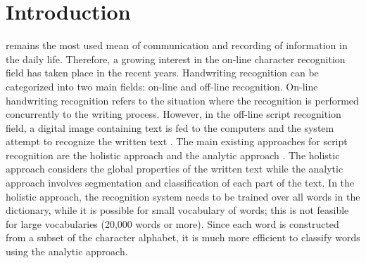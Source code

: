 \documentclass[journal,compsoc]{IEEEtran}
\begin{document}
\IEEEdisplaynotcompsoctitleabstractindextext

\section{Introduction}
\date
{} remains the most used mean of communication and recording of information in the daily life. Therefore, a growing interest in the on-line character recognition field has taken place in the recent years.
Handwriting recognition can be categorized into two main fields: on-line and off-line recognition. On-line handwriting recognition refers to the situation where the recognition is performed concurrently to the writing process. However, in the off-line script recognition field, a digital image containing text is fed to the computers and the system attempt to recognize the written text \cite{al2011online}. The main existing approaches for script recognition are the holistic approach \cite{biadsy2011segmentation} and the analytic approach \cite{abdulla2008off, sari2002off, Dinges2011, elanwar2012unconstrained}. The holistic approach considers the global properties of the written text while the analytic approach involves segmentation and classification of each part of the text.  In the holistic approach, the recognition system needs to be trained over all words in the dictionary, while it is possible for small vocabulary of words; this is not feasible for large vocabularies (20,000 words or more). Since each word is constructed from a subset of the character alphabet, it is much more efficient to classify words using the analytic approach. \cite{elanwar2012unconstrained} \\
\end{document}
